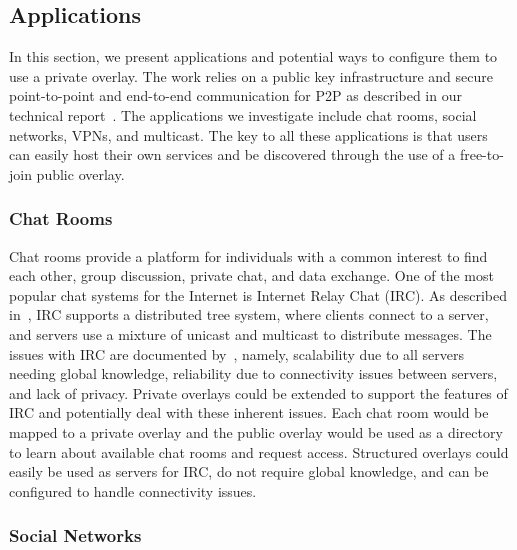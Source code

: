 \documentclass[conference]{IEEEtran}
\begin{document}
\subsection{Applications}

In this section, we present applications and potential ways to configure them
to use a private overlay.  The work relies on a public key infrastructure and
secure point-to-point and end-to-end communication for P2P as described in our
technical report~\cite{vpo}.  The applications we investigate include chat
rooms, social networks, VPNs, and multicast.  The key to all these applications
is that users can easily host their own services and be discovered through the
use of a free-to-join public overlay.

\subsubsection{Chat Rooms}

Chat rooms provide a platform for individuals with a common interest to find
each other, group discussion, private chat, and data exchange.  One of the most
popular chat systems for the Internet is Internet Relay Chat (IRC).  As
described in~\cite{irc}, IRC supports a distributed tree system, where clients
connect to a server, and servers use a mixture of unicast and multicast to
distribute messages.  The issues with IRC are documented by~\cite{irc_arch},
namely, scalability due to all servers needing global knowledge, reliability
due to connectivity issues between servers, and lack of privacy.  Private
overlays could be extended to support the features of IRC and potentially deal
with these inherent issues.  Each chat room would be mapped to a private
overlay and the public overlay would be used as a directory to learn about
available chat rooms and request access.  Structured overlays could easily be
used as servers for IRC, do not require global knowledge, and can be configured
to handle connectivity issues.

\subsubsection{Social Networks}
\end{document}
